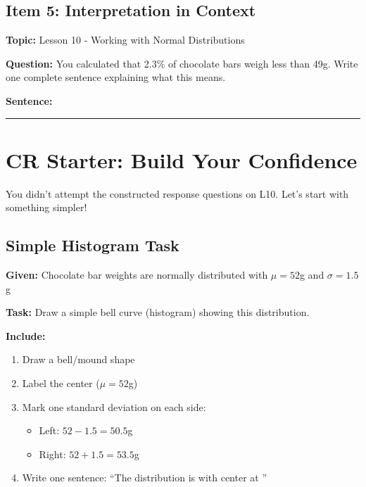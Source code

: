 \documentclass[11pt]{article}
\begin{document}
\subsection*{Item 5: Interpretation in Context}
\textbf{Topic:} Lesson 10 - Working with Normal Distributions

\textbf{Question:} You calculated that 2.3\% of chocolate bars weigh less than 49g. Write one complete sentence explaining what this means.

\textbf{Sentence:}

\vspace{1.5in}

\hrule

\vspace{0.2in}

\section*{CR Starter: Build Your Confidence}

You didn't attempt the constructed response questions on L10. Let's start with something simpler!

\subsection*{Simple Histogram Task}

\textbf{Given:} Chocolate bar weights are normally distributed with $\mu = 52$g and $\sigma = 1.5$g

\textbf{Task:} Draw a simple bell curve (histogram) showing this distribution.

\textbf{Include:}
\begin{enumerate}
    \item Draw a bell/mound shape
    \item Label the center ($\mu = 52$g)
    \item Mark one standard deviation on each side:
    \begin{itemize}
        \item Left: $52 - 1.5 = 50.5$g
        \item Right: $52 + 1.5 = 53.5$g
    \end{itemize}
    \item Write one sentence: ``The distribution is \underline{\hspace{1in}} with center at \underline{\hspace{1in}}''
\end{enumerate}
\end{document}
